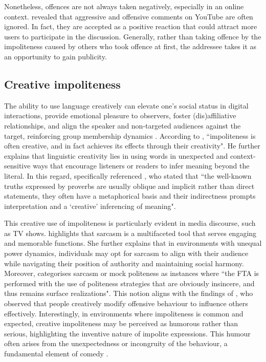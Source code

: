 \documentclass[english]{textolivre}
\begin{document}
Nonetheless, offences are not always taken negatively, especially in an online context. \textcite{boyd2014} revealed that aggressive and offensive comments on YouTube are often ignored. In fact, they are accepted as a positive reaction that could attract more users to participate in the discussion. Generally, rather than taking offence by the impoliteness caused by others who took offence at first, the addressee takes it as an opportunity to gain publicity.

\subsection{Creative impoliteness}
The ability to use language creatively can elevate one’s social status in digital interactions, provide emotional pleasure to observers, foster (dis)affiliative relationships, and align the speaker and non-targeted audiences against the target, reinforcing group membership dynamics \cite{andersson2023}. According to \textcite[p. 6]{culpeper2013}, ``impoliteness is often creative, and in fact achieves its effects through their creativity". He further explains that linguistic creativity lies in using words in unexpected and context-sensitive ways that encourage listeners or readers to infer meaning beyond the literal. In this regard, \textcite{culpeper2013} specifically referenced \textcite[p. 134]{carter2004}, who stated that ``the well-known truths expressed by proverbs are usually oblique and implicit rather than direct statements, they often have a metaphorical basis and their indirectness prompts interpretation and a ‘creative’ inferencing of meaning". 

This creative use of impoliteness is particularly evident in media discourse, such as TV shows. \textcite{kantara2010} highlights that sarcasm is a multifaceted tool that serves engaging and memorable functions. She further explains that in environments with unequal power dynamics, individuals may opt for sarcasm to align with their audience while navigating their position of authority and maintaining social harmony. Moreover, \textcite[p. 356]{culpeper1996} categorises sarcasm or mock politeness as instances where ``the FTA is performed with the use of politeness strategies that are obviously insincere, and thus remains surface realizations". This notion aligns with the findings of \textcite{bousfield2018}, who observed that people creatively modify offensive behaviour to influence others effectively. Interestingly, in environments where impoliteness is common and expected, creative impoliteness may be perceived as humorous rather than serious, highlighting the inventive nature of impolite expressions. This humour often arises from the unexpectedness or incongruity of the behaviour, a fundamental element of comedy \cite{raskin1985}.
\end{document}
